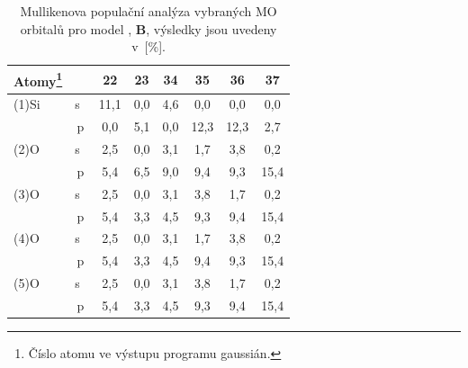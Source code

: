 \documentclass[
digital, %
table,   %
lof,     %
lot,     %
oneside,
]{fithesis3}
\begin{document}
\begin{table}[H] \begin{minipage}{\textwidth}
\caption{Mullikenova populační analýza vybraných MO orbitalů pro model , \textbf{B}, výsledky jsou uvedeny v~[\%].}
\begin{center}
\begin{tabular}{|l|c|c|c|c|c|c|c|}
\hline
Atomy\footnote{Číslo atomu ve výstupu programu gaussián.}\label{si_och3_4_MPA} &  & 22 & 23 & 34 & 35 & 36 & 37 \\ \hline
(1)Si & s~& 11,1  & 0,0  & 4,6  & 0,0  & 0,0  & 0,0  \\ \hline
& p & 0,0  & 5,1  & 0,0  & 12,3  & 12,3  & 2,7  \\ \hline
(2)O& s~& 2,5  & 0,0  & 3,1  & 1,7  & 3,8  & 0,2  \\ \hline
& p & 5,4  & 6,5  & 9,0  & 9,4  & 9,3  & 15,4  \\ \hline
(3)O & s~& 2,5  & 0,0  & 3,1  & 3,8  & 1,7  & 0,2  \\ \hline
& p & 5,4  & 3,3  & 4,5  & 9,3  & 9,4  & 15,4  \\ \hline
(4)O & s~& 2,5  & 0,0  & 3,1  & 1,7  & 3,8  & 0,2  \\ \hline
& p & 5,4  & 3,3  & 4,5  & 9,4  & 9,3  & 15,4  \\ \hline
(5)O & s~& 2,5  & 0,0  & 3,1  & 3,8  & 1,7  & 0,2  \\ \hline
& p & 5,4  & 3,3  & 4,5  & 9,3  & 9,4  & 15,4  \\ \hline
\end{tabular}
\end{center}
\end{minipage}
\end{table}
\end{document}

